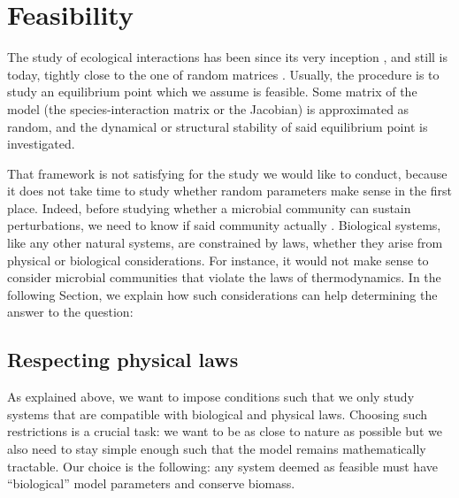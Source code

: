 \documentclass[12pt, titlepage]{report}
\begin{document}
\section{Feasibility}\label{sec : intro feasibility}
The study of ecological interactions has been since its very inception \cite{may_will_1972}, and still is today, tightly close to the one of random matrices \cite{allesina_stability_2012, allesina_predicting_2015, barbier_cavity_2017}. Usually, the procedure is to study an equilibrium point which we assume is feasible. Some matrix of the model (\eg the species-interaction matrix or the Jacobian) is approximated as random, and the dynamical or structural stability of said equilibrium point is investigated.

That framework is not satisfying for the study we would like to conduct, because it does not take time to study whether random parameters make sense in the first place.
Indeed, before studying whether a microbial community can sustain perturbations, we need to know if said community actually . Biological systems, like any other natural systems, are constrained by laws, whether they arise from physical or biological considerations. For instance, it would not make sense to consider microbial communities that \eg violate the laws of thermodynamics. In the following Section, we explain how such considerations can help determining the answer to the  question:

\begin{centering}
\end{centering}
\subsection{Respecting physical laws}\label{sec : methods feasibility basic concepts}
As explained above, we want to impose conditions such that we only study systems that are compatible with biological and physical laws. Choosing such restrictions is a crucial task: we want to be as close to nature as possible but we also need to stay simple enough such that the model remains mathematically tractable. Our %
choice is the following:
  any system deemed as feasible must have ``biological'' model parameters and conserve biomass.
\end{document}
